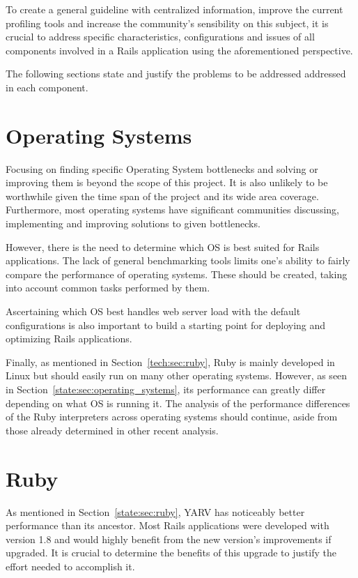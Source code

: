 To create a general guideline with centralized information, improve the current profiling tools and increase the community's sensibility on this subject, it is crucial to address specific characteristics, configurations and issues of all components involved in a Rails application using the aforementioned perspective. 

The following sections state and justify the problems to be addressed addressed in each component.

\section{Operating Systems}
\label{probsta:operating_systems}
Focusing on finding specific Operating System bottlenecks and solving or improving them is beyond the scope of this project. It is also unlikely to be worthwhile given the time span of the project and its wide area coverage. Furthermore, most operating systems have significant communities discussing, implementing and improving solutions to given bottlenecks.

However, there is the need to determine which OS is best suited for Rails applications. The lack of general benchmarking tools limits one's ability to fairly compare the performance of operating systems. These should be created, taking into account common tasks performed by them. 

Ascertaining which OS best handles web server load with the default configurations is also important to build a starting point for deploying and optimizing Rails applications. 

Finally, as mentioned in Section~\ref{tech:sec:ruby}, Ruby is mainly developed in Linux but should easily run on many other operating systems. However, as seen in Section~\ref{state:sec:operating_systems}, its performance can greatly differ depending on what OS is running it. The analysis of the performance differences of the Ruby interpreters across operating systems should continue, aside from those already determined in other recent analysis.

\section{Ruby}
As mentioned in Section~\ref{state:sec:ruby}, YARV has noticeably better performance than its ancestor. Most Rails applications were developed with version 1.8 and would highly benefit from the new version's improvements if upgraded. It is crucial to determine the benefits of this upgrade to justify the effort needed to accomplish it. 

